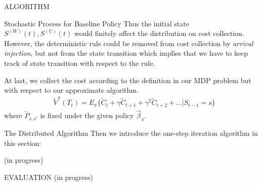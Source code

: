 \documentclass[10pt, conference, letterpaper]{IEEEtran}
\begin{document}
\begin{section}{ALGORITHM}
\begin{subsection}{Stochastic Process for Baseline Policy}
            Thus the initial state $S^{(W)}(t), S^{(U)}(t)$ would finitely affect the distribution on cost collection. However, the deterministic rule could be removed from cost collection by \emph{arrival injection}, but not from the state transition which implies that we have to keep track of state transition with respect to the rule.

            At last, we collect the cost according to the definition in our MDP problem but with respect to our approximate algorithm.
            \begin{align}
                & \tilde{V}^{\pi}(T_t)
                \nonumber%
                = E_{\pi} \{ \tilde{C}_{t} + \gamma \tilde{C}_{t+1} + \gamma^2 \tilde{C}_{t+2} + \dots |S_{t-1}=s \}
            \end{align}
            where $\tilde{P}_{s,s'}$ is fixed under the given policy $\vec{\beta}_{\pi}$.
        \end{subsection}

        \begin{subsection}{The Distributed Algorithm}
            Then we introduce the one-step iteration algorithm in this section:
            \begin{algorithm}[H]
                \caption{Distributed Algorithm for $k$-th AP}
                \begin{algorithmic}
                    \WHILE{\TRUE}
                        \STATE (in progress)
                    \ENDWHILE
                \end{algorithmic}
            \end{algorithm}
        \end{subsection}
        
    \end{section}

    \begin{section}{EVALUATION}
        \label{sec:evaluation}
        (in progress)
    \end{section}
\end{document}
